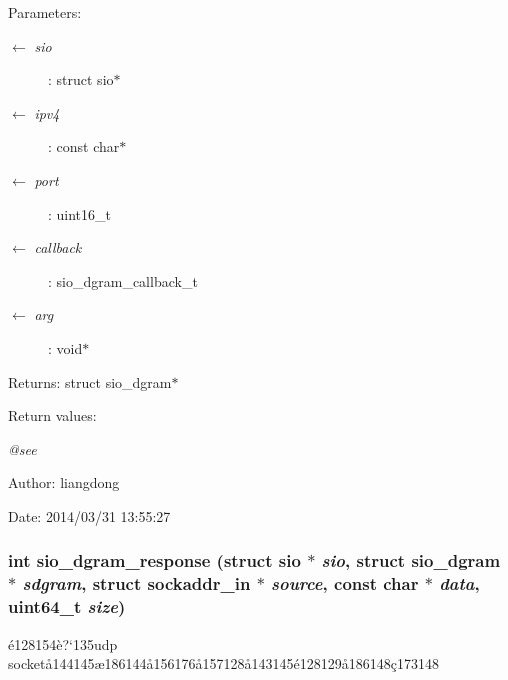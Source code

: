 \begin{Desc}
\item[Parameters:]
\begin{description}
\item[\mbox{$\leftarrow$} {\em sio}]: struct sio$\ast$ \item[\mbox{$\leftarrow$} {\em ipv4}]: const char$\ast$ \item[\mbox{$\leftarrow$} {\em port}]: uint16\_\-t \item[\mbox{$\leftarrow$} {\em callback}]: sio\_\-dgram\_\-callback\_\-t \item[\mbox{$\leftarrow$} {\em arg}]: void$\ast$ \end{description}
\end{Desc}
\begin{Desc}
\item[Returns:]struct sio\_\-dgram$\ast$ \end{Desc}
\begin{Desc}
\item[Return values:]
\begin{description}
\item[{\em @see}]\end{description}
\end{Desc}
\begin{Desc}
\item[Author:]liangdong \end{Desc}
\begin{Desc}
\item[Date:]2014/03/31 13:55:27 \end{Desc}
\subsubsection{\setlength{\rightskip}{0pt plus 5cm}int sio\_\-dgram\_\-response (struct sio $\ast$ {\em sio}, struct sio\_\-dgram $\ast$ {\em sdgram}, struct sockaddr\_\-in $\ast$ {\em source}, const char $\ast$ {\em data}, uint64\_\-t {\em size})}\label{sio__dgram_8h_a4}


\'{e}128154\`{e}?`135udp socket\aa{}144145\ae{}186144\aa{}156176\aa{}157128\aa{}143145\'{e}128129\aa{}186148\c{c}173148 

